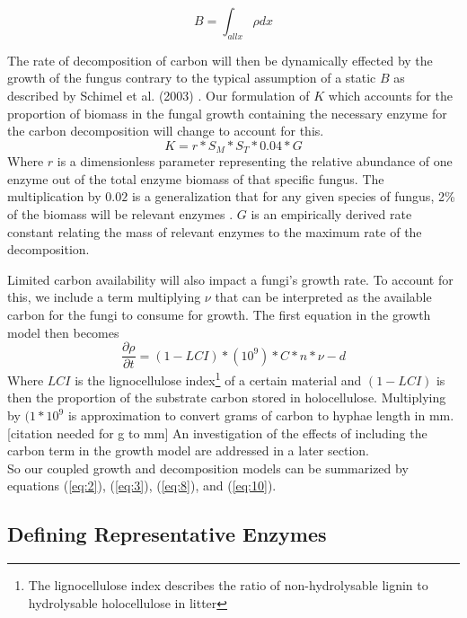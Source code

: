 \documentclass[12pt]{article}
\begin{document}
\begin{multicols}{2}
\begin{equation} \label {eq:8}
B = \int_{all x}\rho dx
\end{equation}

The rate of decomposition of carbon will then be dynamically effected by the growth of the fungus contrary to the typical assumption of a static $B$ as described by Schimel et al. (2003) \cite{Schimel2003}. Our formulation of $K$ which accounts for the proportion of biomass in the fungal growth containing the necessary enzyme for the carbon decomposition will change to account for this. 
\begin{equation} \label {eq}
K = r*S_{M}*S_{T}*0.04*G
\end{equation}
Where $r$ is a dimensionless parameter representing the relative abundance of one enzyme out of the total enzyme biomass of that specific fungus. The multiplication by $0.02$ is a generalization that for any given species of fungus, 2\% of the biomass will be relevant enzymes \cite{Moorhead2006}. $G$ is an empirically derived rate constant relating the mass of relevant enzymes to the maximum rate of the decomposition.

Limited carbon availability will also impact a fungi's growth rate. To account for this, we include a term multiplying $\nu$ that can be interpreted as the available carbon for the fungi to consume for growth. The first equation in the growth model then becomes
\begin{equation} \label{eq:10}
\frac{\partial \rho}{\partial t} = (1-LCI)*(10^{9})*C*n*\nu - d
\end{equation}
Where $LCI$ is the lignocellulose index\footnote{The lignocellulose index describes the ratio of non-hydrolysable lignin to hydrolysable holocellulose in litter} of a certain material and $(1-LCI)$ is then the proportion of the substrate carbon stored in holocellulose. Multiplying by $(1*10^{9}$ is approximation to convert grams of carbon to hyphae length in mm. [citation needed for g to mm] An investigation of the effects of including the carbon term in the growth model are addressed in a later section. \\

So our coupled growth and decomposition models can be summarized by equations (\ref{eq:2}), (\ref{eq:3}), (\ref{eq:8}), and (\ref{eq:10}).

\subsection{Defining Representative Enzymes}


\end{multicols}
\end{document}

